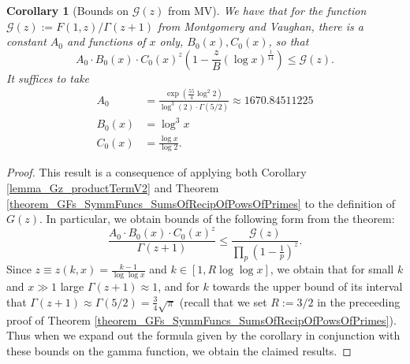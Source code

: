 \documentclass[11pt,reqno,a4letter]{article}
\numberwithin{figure}{section}
\numberwithin{table}{section}
\theoremstyle{plain}
\newtheorem{cor}[theorem]{Corollary}
\numberwithin{theorem}{section}
\theoremstyle{definition}
\begin{document}
\begin{cor}[Bounds on $\mathcal{G}(z)$ from MV] 
\label{cor_BoundsOnGz_FromMVBook_initial_stmt_v1} 
We have that for the function $\mathcal{G}(z) := F(1, z) / \Gamma(z+1)$ from Montgomery and Vaughan, there 
is a constant $A_0$ and functions of $x$ only, $B_0(x), C_0(x)$, so that 
\[
A_0 \cdot B_0(x) \cdot C_0(x)^{z} \left(1 - \frac{z}{B} (\log x)^{\frac{1}{14}}\right) \leq \mathcal{G}(z). 
\]
It suffices to take 
\begin{align*} 
A_0 & = \frac{\exp\left(\frac{55}{4} \log^2 2\right)}{\log^3(2) \cdot \Gamma(5/2)} 
     \approx 1670.84511225 \\ 
B_0(x) & = \log^3 x \\ 
C_0(x) & = \frac{\log x}{\log 2}. 
\end{align*} 
\end{cor}
\begin{proof} 
This result is a consequence of applying both 
Corollary \ref{lemma_Gz_productTermV2} and 
Theorem \ref{theorem_GFs_SymmFuncs_SumsOfRecipOfPowsOfPrimes} to the definition of $G(z)$. 
In particular, we obtain bounds of the following form from the theorem: 
\[
\frac{A_0 \cdot B_0(x) \cdot C_0(x)^{z}}{\Gamma(z+1)} \leq 
     \frac{\mathcal{G}(z)}{\prod_p \left(1-\frac{1}{p}\right)^{z}}. 
\]
Since $z \equiv z(k, x) = \frac{k-1}{\log\log x}$ and $k \in [1, R\log\log x]$, we obtain that 
for small $k$ and $x \gg 1$ large $\Gamma(z+1) \approx 1$, and for $k$ towards the upper bound of 
its interval that $\Gamma(z+1) \approx \Gamma(5/2) = \frac{3}{4} \sqrt{\pi}$ 
(recall that we set $R := 3/2$ in the 
preceeding proof of Theorem \ref{theorem_GFs_SymmFuncs_SumsOfRecipOfPowsOfPrimes}). 
Thus when we expand out the formula given by the corollary in conjunction with these bounds on the 
gamma function, we obtain the claimed results. 
\end{proof} 
\end{document}
